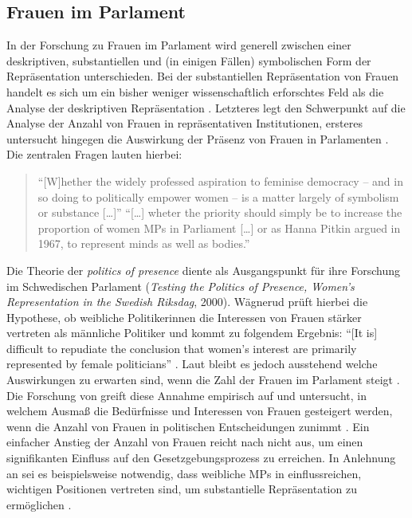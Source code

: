 \documentclass[12pt, 
    twoside=false, 
    bibliography=totoc, 
    numbers=endperiod, 
    headings=normal, 
    toc=chapterentrydotfill
    ]{scrbook}
\begin{document}
\subsection{Frauen im Parlament}

In der Forschung zu Frauen im Parlament wird generell zwischen einer deskriptiven, substantiellen und (in einigen Fällen) symbolischen Form der Repräsentation unterschieden. Bei der substantiellen Repräsentation von Frauen handelt es sich um ein bisher weniger wissenschaftlich erforschtes Feld als die Analyse der deskriptiven Repräsentation \parencite[59]{wangnerud_2009}. 
Letzteres legt den Schwerpunkt auf die Analyse der Anzahl von Frauen in repräsentativen Institutionen, ersteres untersucht hingegen die Auswirkung der Präsenz von Frauen in Parlamenten \parencites[14]{coffe_2013}[52]{wangnerud_2009}.
Die zentralen Fragen lauten hierbei:

\citereset
\begin{quote}
  \enquote{[W]hether the widely professed aspiration to feminise democracy -- and in so doing to politically empower women -- is a matter largely of symbolism or substance […]}
  \enquote{[…] wheter the priority should simply be to increase the proportion of women MPs in Parliament […] or as Hanna Pitkin argued in 1967, to represent minds as well as bodies.}
  \parencite[413]{blaxill_2016}
\end{quote}

%
Die Theorie der \emph{politics of presence} \parencite{phillips_1998} diente \textcite{wangnerud_2000} als Ausgangspunkt für ihre Forschung im Schwedischen Parlament (\emph{Testing the Politics of Presence, Women's Representation in the Swedish Riksdag}, 2000). Wägnerud prüft hierbei die Hypothese, ob weibliche Politikerinnen die Interessen von Frauen stärker vertreten als männliche Politiker und kommt zu folgendem Ergebnis: \enquote{[It is] difficult to repudiate the conclusion that women's interest are primarily represented by female politicians} \parencite[][84]{wangnerud_2000}. Laut \citeauthor{wangnerud_2000} bleibt es jedoch ausstehend welche Auswirkungen zu erwarten sind, wenn die Zahl der Frauen im Parlament steigt \parencite{wangnerud_2009}.
Die Forschung von \textcite{celis_2008} greift diese Annahme empirisch auf und untersucht, in welchem Ausmaß die Bedürfnisse und Interessen von Frauen gesteigert werden, wenn die Anzahl von Frauen in politischen Entscheidungen zunimmt \parencite[vgl. auch][4]{galligan_2016}. Ein einfacher Anstieg der Anzahl von Frauen reicht nach \textcite{celis_2008} nicht aus, um einen signifikanten Einfluss auf den Gesetzgebungsprozess zu erreichen. In Anlehnung an \textcite{caul_2001} sei es beispielsweise notwendig, dass weibliche MPs in einflussreichen, wichtigen Positionen vertreten sind, um substantielle Repräsentation zu ermöglichen \parencites{caul_2001}[vgl. auch][14]{coffe_2013}.
\end{document}
